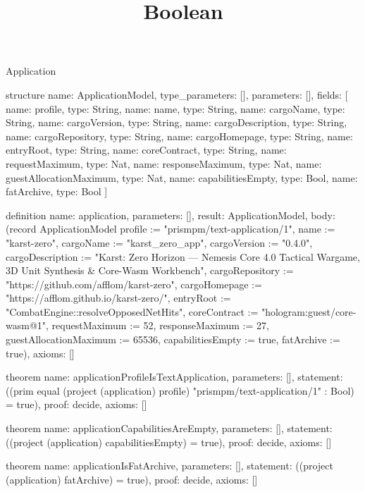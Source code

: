 \begin{lexlean}{Application}
\title{Boolean}
\begin{semanticmodule}
structure{
  name: ApplicationModel,
  type_parameters: [],
  parameters: [],
  fields: [
    {name: profile, type: String},
    {name: name, type: String},
    {name: cargoName, type: String},
    {name: cargoVersion, type: String},
    {name: cargoDescription, type: String},
    {name: cargoRepository, type: String},
    {name: cargoHomepage, type: String},
    {name: entryRoot, type: String},
    {name: coreContract, type: String},
    {name: requestMaximum, type: Nat},
    {name: responseMaximum, type: Nat},
    {name: guestAllocationMaximum, type: Nat},
    {name: capabilitiesEmpty, type: Bool},
    {name: fatArchive, type: Bool}
  ]
}

definition{
  name: application,
  parameters: [],
  result: ApplicationModel,
  body: (record ApplicationModel {profile := "prismpm/text-application/1", name := "karst-zero", cargoName := "karst_zero_app", cargoVersion := "0.4.0", cargoDescription := "Karst: Zero Horizon — Nemesis Core 4.0 Tactical Wargame, 3D Unit Synthesis & Core-Wasm Workbench", cargoRepository := "https://github.com/afflom/karst-zero", cargoHomepage := "https://afflom.github.io/karst-zero/", entryRoot := "CombatEngine::resolveOpposedNetHits", coreContract := "hologram:guest/core-wasm@1", requestMaximum := 52, responseMaximum := 27, guestAllocationMaximum := 65536, capabilitiesEmpty := true, fatArchive := true}),
  axioms: []
}

theorem{
  name: applicationProfileIsTextApplication,
  parameters: [],
  statement: ((prim equal (project (application) profile) "prismpm/text-application/1" : Bool) = true),
  proof: decide{},
  axioms: []
}

theorem{
  name: applicationCapabilitiesAreEmpty,
  parameters: [],
  statement: ((project (application) capabilitiesEmpty) = true),
  proof: decide{},
  axioms: []
}

theorem{
  name: applicationIsFatArchive,
  parameters: [],
  statement: ((project (application) fatArchive) = true),
  proof: decide{},
  axioms: []
}
\end{semanticmodule}
\end{lexlean}
